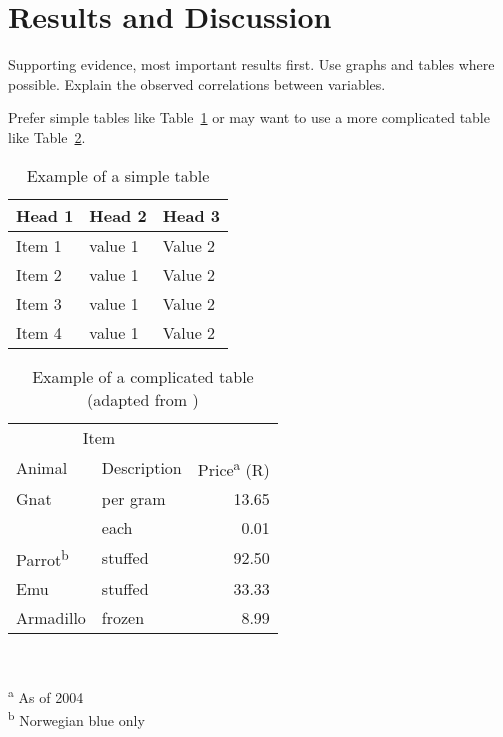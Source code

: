 \documentclass[a4paper,12pt]{article}
\begin{document}
\section{Results and Discussion}
Supporting evidence, most important results first. Use graphs and tables where possible. Explain the observed correlations between variables.

Prefer simple tables like Table~\ref{tab:simpletabexample} or may want to use a
more complicated table like Table~\ref{tab:tabexample}.
\begin{table}[htbp]
  \centering
  \caption{Example of a simple table}
  \label{tab:simpletabexample}
  \begin{tabular}{lll}
    \toprule
    Head 1 & Head 2& Head 3 \\
    \midrule
    Item 1 & value 1 & Value 2 \\
    Item 2 & value 1 & Value 2 \\
    Item 3 & value 1 & Value 2 \\
    Item 4 & value 1 & Value 2 \\
    \bottomrule
  \end{tabular}
\end{table}

\begin{table}[htbp]
  \centering
  \caption[Short caption for table of tables]{Example of a complicated table (adapted from \textcite{fear})}
  \label{tab:tabexample}
  \begin{minipage}{0.5\textwidth}
    \begin{centering}
      \begin{tabular}{@{}llr@{}} \toprule 
        \multicolumn{2}{c}{Item}                                               \\ 
        \cmidrule(r){1-2} 
        Animal                    & Description & Price\textsuperscript{a} (R) \\ 
        \midrule 
        Gnat                      & per gram    & \num{13.65}                  \\ 
                                  & each        & \num{0.01}                   \\ 
        Parrot\textsuperscript{b} & stuffed     & \num{92.50}                  \\ 
        Emu                       & stuffed     & \num{33.33}                  \\ 
        Armadillo                 & frozen      & \num{8.99}                   \\ 
        \bottomrule 
      \end{tabular}                                                            \\
    \end{centering} 
    \vspace{1em}
    \textsuperscript{a} As of 2004                                             \\
    \textsuperscript{b} Norwegian blue only
  \end{minipage}
\end{table}
\end{document}
